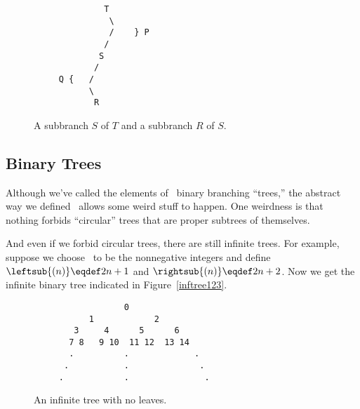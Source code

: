 \begin{definition}

\begin{figure}


\begin{center}
\begin{verbatim}
              T
               \
               /    } P
              /
             S
            /
     Q {   /
           \
            R
\end{verbatim}   
\end{center}

\caption{A subbranch $S$ of $T$ and  a subbranch $R$ of $S$.}

\label{PQdown}

\end{figure}

\subsection{Binary Trees}
Although we've called the elements of \brnch\ binary branching
``trees,'' the abstract way we defined \brnch\ allows some weird stuff
to happen.  One weirdness is that nothing forbids ``circular'' trees
that are proper subtrees of themselves.
\iffalse
For example, it is entirely
possible that there is a structure $T \in \brnch$ such that
\textcolor{red}{
\[
\leftsub{(T)} = T = \rightsub{(T)}.
\]}

This weird binary branching structure doesn't even have any leaves.
\fi
And even if we forbid circular trees, there are still infinite
trees.  For example, suppose we choose \brnch\ to be the nonnegative
integers and define $\leftsub{(n)} \eqdef 2n+1$ and $\rightsub{(n)} \eqdef
2n+2$.  Now we get the infinite binary tree indicated in
Figure~\ref{inftree123}.


\begin{figure}


\begin{verbatim}
                  0
           1            2
        3     4      5      6
       7 8   9 10  11 12  13 14
       .          .             . 
      .           .              .
     .            .               . 

\end{verbatim}

\caption{An infinite tree with no leaves.}


\end{figure}
\end{definition}
